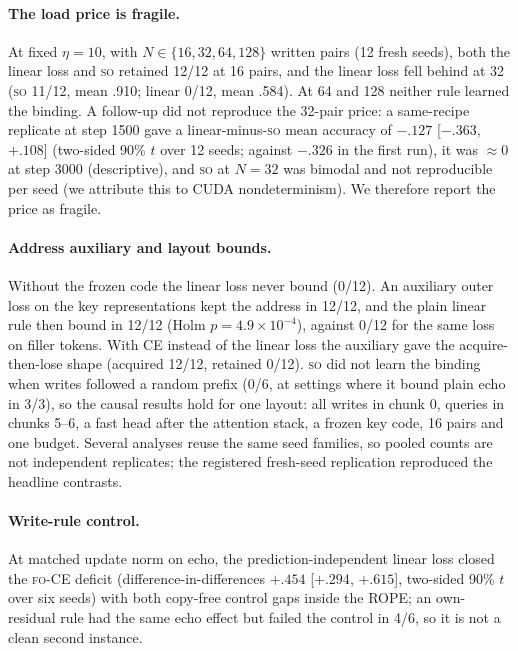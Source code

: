 \documentclass[11pt]{article}
\newcommand{\FO}{\textsc{fo}}
\newcommand{\SO}{\textsc{so}}
\begin{document}
\paragraph{The load price is fragile.} At fixed $\eta=10$, with $N\in\{16,32,64,128\}$ written pairs
(12 fresh seeds), both the linear loss and \SO{} retained 12/12 at 16 pairs, and the linear loss fell behind at 32 (\SO{}
11/12, mean .910; linear 0/12, mean .584). At 64 and 128 neither rule learned the binding. A follow-up
did not reproduce the 32-pair price: a same-recipe replicate at step 1500 gave a linear-minus-\SO{}
mean accuracy of $-.127$ [$-.363$, $+.108$] (two-sided 90\% $t$ over 12 seeds; against $-.326$ in the
first run), it was $\approx0$ at
step 3000 (descriptive), and \SO{} at $N=32$ was bimodal and not reproducible per seed (we attribute this to CUDA
nondeterminism). We therefore report the price as fragile.

\paragraph{Address auxiliary and layout bounds.} Without the frozen code the linear loss never bound
(0/12). An auxiliary outer loss on the key representations kept the address in 12/12, and the plain
linear rule then bound in 12/12 (Holm $p=4.9\times10^{-4}$), against 0/12 for the same loss on filler
tokens. With CE instead of the linear loss the auxiliary gave the acquire-then-lose shape (acquired
12/12, retained 0/12). \SO{} did not learn the binding when writes followed a random prefix (0/6, at
settings where it bound plain echo in 3/3), so the causal results hold for one layout: all writes in
chunk 0, queries in chunks 5--6, a fast head after the attention stack, a frozen key code, 16 pairs and
one budget. Several analyses reuse the same seed families, so pooled counts are not independent
replicates; the registered fresh-seed replication reproduced the headline contrasts.

\paragraph{Write-rule control.} At matched update norm on echo, the prediction-independent linear
loss closed the \FO-CE{} deficit (difference-in-differences $+.454$ [$+.294$, $+.615$], two-sided 90\%
$t$ over six seeds) with both
copy-free control gaps inside the ROPE; an own-residual rule had the same echo effect but failed the
control in 4/6, so it is not a clean second instance.
\end{document}
